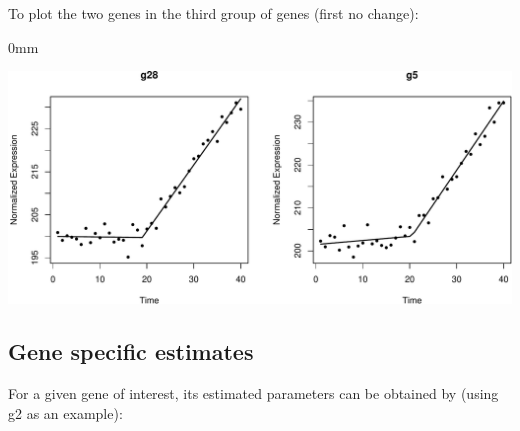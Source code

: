 \documentclass{article}
\begin{document}
To plot the two genes in the third group of genes (first no change):
\begin{knitrout}
\color{fgcolor}\begin{kframe}
\begin{alltt}
\hlstd{(}\hlstd{=}\hlstd{(}\hlstd{,}\hlstd{))}
 \hlkwb{<-} 
                     \hlstd{=} \hlopt{$}\hlstd{firstnochange)[}\hlopt{:}\hlstd{],}
                     
\end{alltt}
\end{kframe}\begin{adjustwidth}{\fltoffset}{0mm}

{\centering \includegraphics[width=\maxwidth]{figure/unnamed-chunk-12-1} 

}

\end{adjustwidth}
\end{knitrout}

\subsection{Gene specific estimates}

For a given gene of interest, its estimated parameters can be obtained by 
(using g2 as an example):
\end{document}
